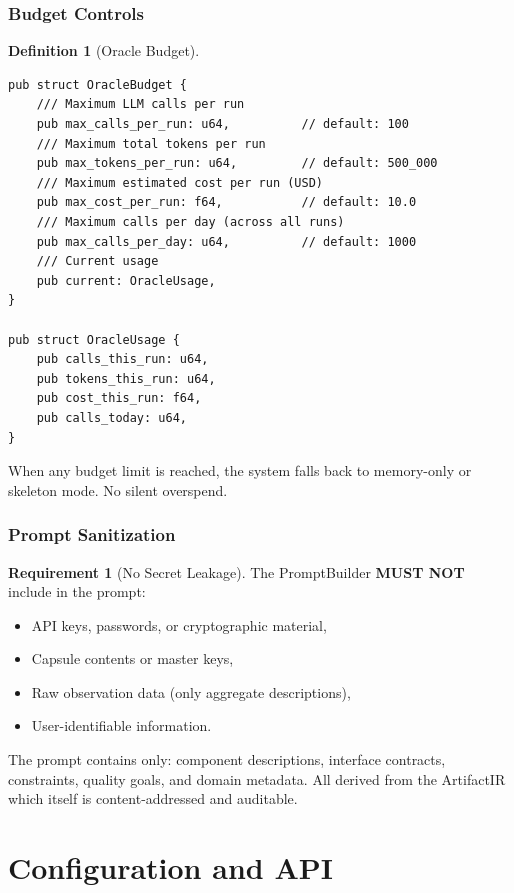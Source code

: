 \documentclass[11pt,a4paper,twoside]{article}
\theoremstyle{definition}
\newtheorem{definition}{Definition}[section]
\newtheorem{requirement}{Requirement}[section]
\theoremstyle{plain}
\theoremstyle{remark}
\begin{document}
\section{Budget Controls}\label{sec:budget}

\begin{definition}[Oracle Budget]\label{def:budget}
\begin{lstlisting}
pub struct OracleBudget {
    /// Maximum LLM calls per run
    pub max_calls_per_run: u64,          // default: 100
    /// Maximum total tokens per run
    pub max_tokens_per_run: u64,         // default: 500_000
    /// Maximum estimated cost per run (USD)
    pub max_cost_per_run: f64,           // default: 10.0
    /// Maximum calls per day (across all runs)
    pub max_calls_per_day: u64,          // default: 1000
    /// Current usage
    pub current: OracleUsage,
}

pub struct OracleUsage {
    pub calls_this_run: u64,
    pub tokens_this_run: u64,
    pub cost_this_run: f64,
    pub calls_today: u64,
}
\end{lstlisting}
When any budget limit is reached, the system falls back to memory-only
or skeleton mode. No silent overspend.
\end{definition}

\section{Prompt Sanitization}\label{sec:sanitize}

\begin{requirement}[No Secret Leakage]\label{req:noleak}
The PromptBuilder \textbf{MUST NOT} include in the prompt:
\begin{itemize}[nosep]
  \item API keys, passwords, or cryptographic material,
  \item Capsule contents or master keys,
  \item Raw observation data (only aggregate descriptions),
  \item User-identifiable information.
\end{itemize}
The prompt contains only: component descriptions, interface contracts,
constraints, quality goals, and domain metadata. All derived from the
ArtifactIR which itself is content-addressed and auditable.
\end{requirement}


\part{Configuration and API}\label{part:config}
\end{document}
